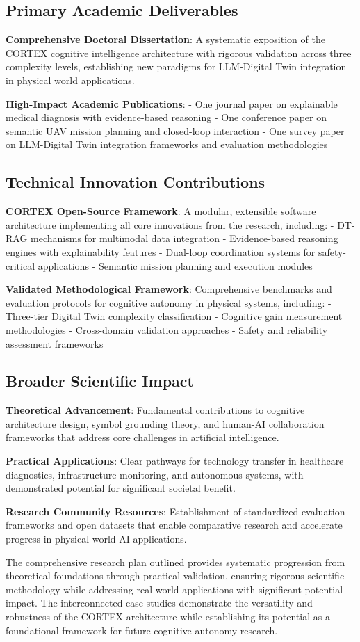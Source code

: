 \subsection{Primary Academic Deliverables}

\textbf{Comprehensive Doctoral Dissertation}: A systematic exposition of the CORTEX cognitive intelligence architecture with rigorous validation across three complexity levels, establishing new paradigms for LLM-Digital Twin integration in physical world applications.

\textbf{High-Impact Academic Publications}: 
- One journal paper on explainable medical diagnosis with evidence-based reasoning
- One conference paper on semantic UAV mission planning and closed-loop interaction
- One survey paper on LLM-Digital Twin integration frameworks and evaluation methodologies

\subsection{Technical Innovation Contributions}

\textbf{CORTEX Open-Source Framework}: A modular, extensible software architecture implementing all core innovations from the research, including:
- DT-RAG mechanisms for multimodal data integration
- Evidence-based reasoning engines with explainability features
- Dual-loop coordination systems for safety-critical applications
- Semantic mission planning and execution modules

\textbf{Validated Methodological Framework}: Comprehensive benchmarks and evaluation protocols for cognitive autonomy in physical systems, including:
- Three-tier Digital Twin complexity classification
- Cognitive gain measurement methodologies
- Cross-domain validation approaches
- Safety and reliability assessment frameworks

\subsection{Broader Scientific Impact}

\textbf{Theoretical Advancement}: Fundamental contributions to cognitive architecture design, symbol grounding theory, and human-AI collaboration frameworks that address core challenges in artificial intelligence.

\textbf{Practical Applications}: Clear pathways for technology transfer in healthcare diagnostics, infrastructure monitoring, and autonomous systems, with demonstrated potential for significant societal benefit.

\textbf{Research Community Resources}: Establishment of standardized evaluation frameworks and open datasets that enable comparative research and accelerate progress in physical world AI applications.

The comprehensive research plan outlined provides systematic progression from theoretical foundations through practical validation, ensuring rigorous scientific methodology while addressing real-world applications with significant potential impact. The interconnected case studies demonstrate the versatility and robustness of the CORTEX architecture while establishing its potential as a foundational framework for future cognitive autonomy research.